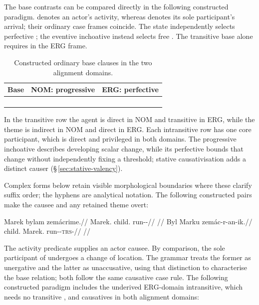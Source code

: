 The base contrasts can be compared directly in the following constructed
paradigm.  denotes an actor's activity, whereas 
denotes its sole participant's arrival; their ordinary case frames coincide.
The state  independently selects perfective ;
the eventive inchoative  instead selects free .
The transitive base alone requires  in the ERG frame.

\begin{table}[htbp]
\footnotesize
\caption{Constructed ordinary base clauses in the two alignment domains.}
\label{tab:valency-base-contrasts}
\begin{tabularx}{\textwidth}{l L L}
\toprule
Base & NOM: progressive & ERG: perfective \\
\midrule
{} &  &  \\
 &  &  \\
 &  &  \\
 &  &  \\
\bottomrule
\end{tabularx}
\end{table}

In the transitive row the agent is direct in NOM and transitive in ERG,
while the theme is indirect in NOM and direct in ERG. Each intransitive row
has one core participant, which is direct and privileged in both domains.
The progressive inchoative describes developing scalar change, while its
perfective bounds that change without independently fixing a threshold; stative causativisation adds
a distinct causer (§\,\ref{sec:stative-valency}).

Complex forms below retain visible morphological boundaries where these
clarify suffix order; the hyphens are analytical notation. The following
constructed pairs make the causee and any retained theme overt:

\pex\label{ex:val-caus-intransitive}
\a
\begingl
\gla Marek bylam zemácrime.//
\glb Marek.\Dir{} child.\Ind{} run-\Caus{}-\Prog{}//
\glft {}//
\endgl
\a
\begingl
\gla Byl Marku zemác-r-an-ik.//
\glb child.\Dir{} Marek.\Trs{} run-\Caus{}-\textsc{trs}-\Pf{}//
\glft {}//
\endgl
\xe

The activity predicate   supplies an actor causee.
By comparison, the sole participant of   undergoes a
change of location. The grammar treats the former as unergative and the latter
as unaccusative, using that distinction to characterise the base relation;
both follow the same causative case rule. The following constructed paradigm
includes the underived ERG-domain intransitive, which needs no transitive
, and causatives in both alignment domains:

